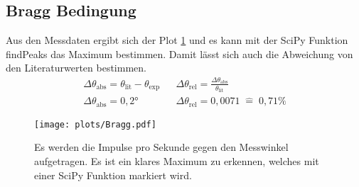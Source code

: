 \subsection{Bragg Bedingung}
Aus den Messdaten ergibt sich der Plot \ref{fig:Bragg} und es kann mit der SciPy Funktion findPeaks das Maximum bestimmen.
Damit lässt sich auch die Abweichung von den Literaturwerten bestimmen.
\begin{align*}
    \Delta \theta_{\text{abs}} = \theta_{\text{lit}}-\theta_{\text{exp}} && \Delta \theta_{\text{rel}} = \frac{\Delta \theta_{\text{abs}}}{\theta_{\text{lit}}}\\
    \Delta \theta_{\text{abs}} = 0,2° &&     \Delta \theta_{\text{rel}} = 0,0071 \; \hat{=} \; 0,71 \% 
\end{align*}
\begin{figure}
    \centering
    \texttt{[image: plots/Bragg.pdf]}
    \caption{Es werden die Impulse pro Sekunde gegen den Messwinkel aufgetragen. Es ist ein klares Maximum zu erkennen, welches mit einer SciPy Funktion markiert wird.}
    \label{fig:Bragg}
\end{figure}


